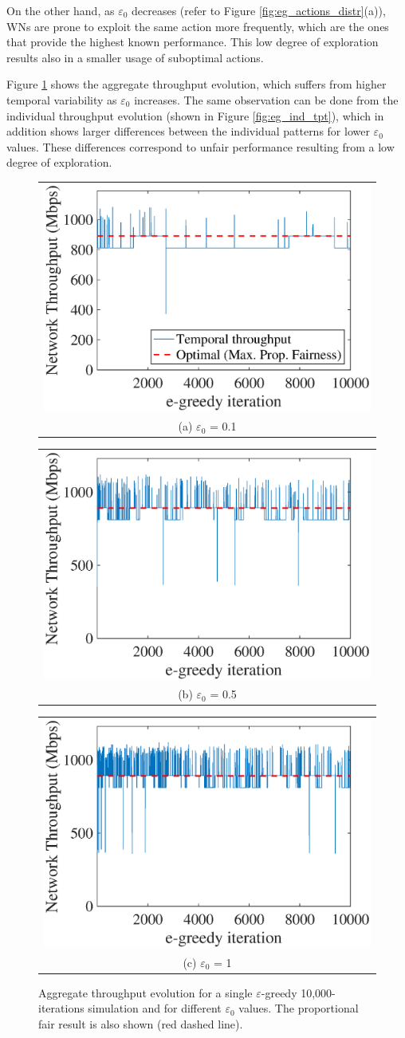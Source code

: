 \documentclass[preprint,12pt]{elsarticle}
\begin{document}
On the other hand, as $\varepsilon_0$ decreases (refer to Figure \ref{fig:eg_actions_distr}(a)), WNs are prone to exploit the same action more frequently, which are the ones that provide the highest known performance. This low degree of exploration results also in a smaller usage of suboptimal actions. 

Figure \ref{fig:eg_agg_tpt}  shows the aggregate throughput evolution, which suffers from higher temporal variability as $\varepsilon_0$ increases. The same observation can be done from the individual throughput evolution (shown in Figure \ref{fig:eg_ind_tpt}), which in addition shows larger differences between the individual patterns for lower $\varepsilon_0$ values. These differences correspond to unfair performance resulting from a low degree of exploration.
\begin{figure}
	\centering
	\begin{tabular}{@{}c@{}}
		\includegraphics[width=.3\textwidth]{images/NEW_temporal_aggregate_tpt_e-greedy_e01} \\[\abovecaptionskip]
		\small (a) $\varepsilon_0$ = 0.1
		\label{fig:eg_e01_agg_tpt}
	\end{tabular}	
	\hspace{\floatsep}	
	\begin{tabular}{@{}c@{}}
		\includegraphics[width=.3\textwidth]{images/NEW_temporal_aggregate_tpt_e-greedy_e05} \\[\abovecaptionskip]
		\small (b) $\varepsilon_0$ = 0.5
		\label{fig:eg_e05_agg_tpt}
	\end{tabular}
	\hspace{\floatsep}
	\begin{tabular}{@{}c@{}}
		\includegraphics[width=.3\textwidth]{images/NEW_temporal_aggregate_tpt_e-greedy_e1} \\[\abovecaptionskip]
		\small (c) $\varepsilon_0$ = 1
		\label{fig:eg_e1_agg_tpt}
	\end{tabular}
	\caption{Aggregate throughput evolution for a single $\varepsilon$-greedy 10,000-iterations simulation and for different $\varepsilon_0$ values. The proportional fair result is also shown (red dashed line).}
	\label{fig:eg_agg_tpt}
\end{figure}
\end{document}
